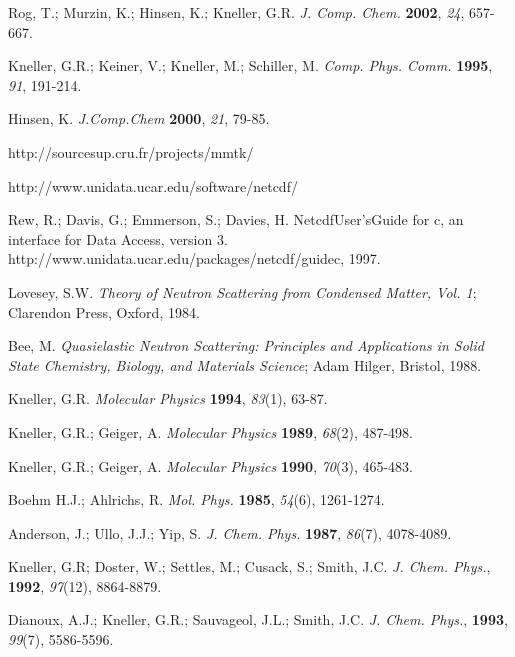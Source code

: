 \documentclass[a4paper,11pt]{article}
\begin{document}
\newpage
{}
{}
\begin{thebibliography}{99}

 Rog, T.; Murzin, K.; Hinsen, K.; Kneller, G.R. \textit{J. Comp. Chem.} \textbf{2002}, \textit{24}, 657-667.

 Kneller, G.R.; Keiner, V.; Kneller, M.; Schiller, M. \textit{Comp. Phys. Comm.} \textbf{1995}, \textit{91}, 191-214.

 Hinsen, K. \textit{J.Comp.Chem} \textbf{2000}, \textit{21}, 79-85.

 http://sourcesup.cru.fr/projects/mmtk/

 http://www.unidata.ucar.edu/software/netcdf/ 

 Rew, R.; Davis, G.; Emmerson, S.; Davies, H. NetcdfUser'sGuide for c, an interface for Data Access, version 3. http://www.unidata.ucar.edu/packages/netcdf/guidec, 1997. 

 Lovesey, S.W. \textit{Theory of Neutron Scattering from Condensed Matter, Vol. 1}; Clarendon Press, Oxford, 1984.

 Bee, M. \textit{Quasielastic Neutron Scattering: Principles and Applications in Solid State Chemistry, Biology, and Materials Science}; Adam Hilger, Bristol, 1988.

 Kneller, G.R. \textit{Molecular Physics} \textbf{1994}, \textit{83}(1), 63-87.

 Kneller, G.R.; Geiger, A. \textit{Molecular Physics} \textbf{1989}, \textit{68}(2), 487-498.

 Kneller, G.R.; Geiger, A. \textit{Molecular Physics} \textbf{1990}, \textit{70}(3), 465-483.

 Boehm H.J.; Ahlrichs, R. \textit{Mol. Phys.} \textbf{1985}, \textit{54}(6), 1261-1274.

 Anderson, J.; Ullo, J.J.; Yip, S. \textit{J. Chem. Phys.} \textbf{1987}, \textit{86}(7), 4078-4089.

 Kneller, G.R; Doster, W.; Settles, M.; Cusack, S.; Smith, J.C. \textit{J. Chem. Phys.}, \textbf{1992}, \textit{97}(12), 8864-8879.

 Dianoux, A.J.; Kneller, G.R.; Sauvageol, J.L.; Smith, J.C. \textit{J. Chem. Phys.}, \textbf{1993}, \textit{99}(7), 5586-5596.


\end{thebibliography}
\end{document}
